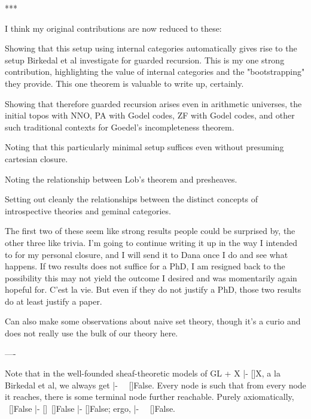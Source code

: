 ***

I think my original contributions are now reduced to these:

Showing that this setup using internal categories automatically gives rise to the setup Birkedal et al investigate for guarded recursion. This is my one strong contribution, highlighting the value of internal categories and the "bootstrapping" they provide. This one theorem is valuable to write up, certainly.

Showing that therefore guarded recursion arises even in arithmetic universes, the initial topos with NNO, PA with Godel codes, ZF with Godel codes, and other such traditional contexts for Goedel's incompleteness theorem.

Noting that this particularly minimal setup suffices even without presuming cartesian closure.

Noting the relationship between Lob's theorem and presheaves.

Setting out cleanly the relationships between the distinct concepts of introspective theories and geminal categories.

The first two of these seem like strong results people could be surprised by, the other three like trivia. I'm going to continue writing it up in the way I intended to for my personal closure, and I will send it to Dana once I do and see what happens. If two results does not suffice for a PhD, I am resigned back to the possibility this may not yield the outcome I desired and was momentarily again hopeful for. C'est la vie. But even if they do not justify a PhD, those two results do at least justify a paper.

Can also make some observations about naive set theory, though it's a curio and does not really use the bulk of our theory here.

----

Note that in the well-founded sheaf-theoretic models of GL + X |- []X, a la Birkedal et al, we always get |- ~~[]False. Every node is such that from every node it reaches, there is some terminal node further reachable. Purely axiomatically, ~[]False |- []~[]False |- []False; ergo, |- ~~[]False.